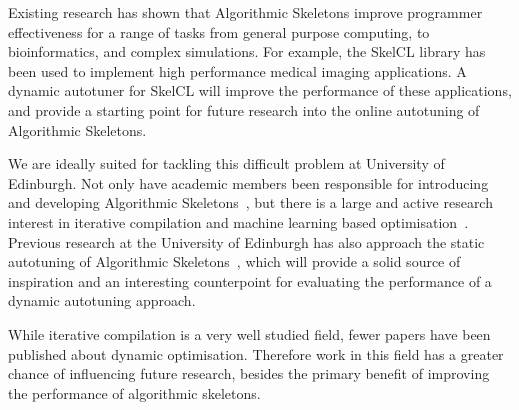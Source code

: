 Existing research has shown that Algorithmic Skeletons improve
programmer effectiveness for a range of tasks from general purpose
computing, to bioinformatics, and complex simulations. For example,
the SkelCL library has been used to implement high performance medical
imaging applications. A dynamic autotuner for SkelCL will improve the
performance of these applications, and provide a starting point for
future research into the online autotuning of Algorithmic Skeletons.

We are ideally suited for tackling this difficult problem at
University of Edinburgh. Not only have academic members been
responsible for introducing and developing Algorithmic
Skeletons~\cite{Cole1989, Cole2004, Benoit2005a}, but there is a large
and active research interest in iterative compilation and machine
learning based optimisation~\cite{Fursin2008, Agakov,
Fursin2005}. Previous research at the University of Edinburgh has also
approach the static autotuning of Algorithmic
Skeletons~\cite{Collins2012, Collins2013}, which will provide a solid
source of inspiration and an interesting counterpoint for evaluating
the performance of a dynamic autotuning approach.

While iterative compilation is a very well studied field, fewer papers
have been published about dynamic optimisation. Therefore work in this
field has a greater chance of influencing future research, besides the
primary benefit of improving the performance of algorithmic skeletons.
